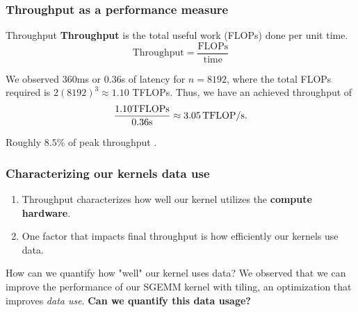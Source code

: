 \documentclass[../main.tex]{subfiles}
\begin{document}
\begin{frame}
  \frametitle{Throughput as a performance measure}
  \begin{block}{Throughput}
    \textbf{Throughput} is the total useful work (FLOPs) done
    per unit time.
    \[
      \mathrm{Throughput} = \frac{\mathrm{FLOPs}}{\mathrm{time}}
    \]
  \end{block}

  \pause
  \begin{example}
    We observed $360$ms or $0.36$s of latency for \(n=8192\),
    where the total FLOPs required is \(2(8192)^3 \approx 1.10\) TFLOPs.
    Thus, we have an achieved throughput of
    \[\frac{1.10\mathrm{ TFLOPs}}{0.36\mathrm{s}} \approx 3.05\,\mathrm{TFLOP/s}. \]

    Roughly $8.5$\% of peak throughput \peakThroughput.
  \end{example}
\end{frame}

\begin{frame}
  \frametitle{Characterizing our kernels data use}
  \begin{enumerate}
    \item Throughput characterizes how well our kernel utilizes the \textbf{compute hardware}.
    \item \pause One factor that impacts final throughput is how efficiently our kernels use data.
  \end{enumerate}

  \pause
  \begin{alertblock}{How can we quantify how "well" our kernel uses data?}
    We observed that we can improve the performance of our SGEMM kernel with
    tiling, an optimization that improves \emph{data use}.
    \pause \textbf{Can we quantify this data usage?}
  \end{alertblock}
\end{frame}
\end{document}
